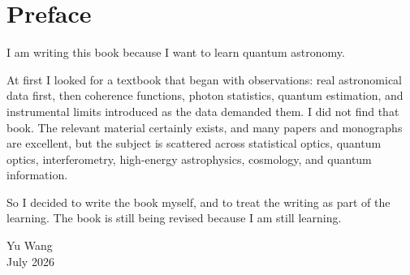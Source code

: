 \chapter*{Preface}

I am writing this book because I want to learn quantum astronomy.

At first I looked for a textbook that began with observations: real astronomical
data first, then coherence functions, photon statistics, quantum estimation, and
instrumental limits introduced as the data demanded them. I did not find that
book. The relevant material certainly exists, and many papers and monographs
are excellent, but the subject is scattered across statistical optics, quantum
optics, interferometry, high-energy astrophysics, cosmology, and quantum
information.

So I decided to write the book myself, and to treat the writing as part of the
learning. The book is still being revised because I am still learning.

\begin{flushright}
Yu Wang\\
July 2026
\end{flushright}

